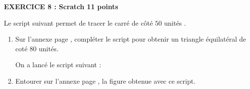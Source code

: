 \textbf{EXERCICE 8 : Scratch \hfill 11 points}

\medskip


Le script suivant permet de tracer le carré de côté $50$ unités .


\begin{center}
\begin{scratch}
{
}
\end{scratch}
\end{center}

\medskip

\begin{enumerate}
\item Sur l'annexe page \pageref{annexe2}, compléter le script pour obtenir un triangle équilatéral de coté $80$ unités.

\medskip

On a lancé le script suivant :

\begin{center}
\begin{scratch}
{
}
\end{scratch}
\end{center}
\item Entourer sur l'annexe page \pageref{annexe2}, la figure obtenue avec ce script.
\end{enumerate}




